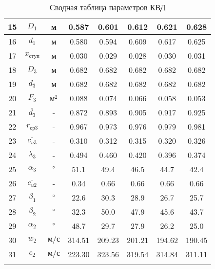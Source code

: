 \begin{center}
\begin{longtable}{|c|c|c|c|c|c|c|c|}
				15 & $D_1$ & м & 0.587 & 0.601 & 0.612 & 0.621 & 0.628 \\\hline
			
				16 & $d_1$ & м & 0.580 & 0.594 & 0.609 & 0.617 & 0.625 \\\hline
			
				17 & $x_{ступ}$ & м & 0.030 & 0.029 & 0.028 & 0.030 & 0.031 \\\hline
			
				18 & $D_3$ & м & 0.682 & 0.682 & 0.682 & 0.682 & 0.682 \\\hline
			
				19 & $d_3$ & м & 0.682 & 0.682 & 0.682 & 0.682 & 0.682 \\\hline
			
				20 & $F_3$ & $м^2$ & 0.088 & 0.074 & 0.066 & 0.058 & 0.053 \\\hline
			
				21 & $\overline{d_3}$ & - & 0.872 & 0.893 & 0.905 & 0.917 & 0.925 \\\hline
			
				22 & $\overline{r_{ср3}}$ & - & 0.967 & 0.973 & 0.976 & 0.979 & 0.981 \\\hline
			
				23 & $\overline{c_{u3}}$ & - & 0.310 & 0.312 & 0.315 & 0.320 & 0.326 \\\hline
			
				24 & $\lambda_3$ & - & 0.494 & 0.460 & 0.420 & 0.396 & 0.374 \\\hline
			
				25 & $\alpha_3$ & $\degree$ & 51.1 & 49.4 & 46.5 & 44.7 & 42.4 \\\hline
			
				26 & $\overline{c_{u2}}$ & - & 0.34 & 0.66 & 0.66 & 0.66 & 0.66 \\\hline
			
				27 & $\beta_1$ & $\degree$ & 22.6 & 30.3 & 28.9 & 26.7 & 25.7 \\\hline
			
				28 & $\beta_2$ & $\degree$ & 32.3 & 50.0 & 47.9 & 45.6 & 43.7 \\\hline
			
				29 & $\alpha_2$ & $\degree$ & 48.7 & 29.7 & 27.9 & 26.2 & 25.0 \\\hline
			
				30 & $w_2$ & $м/с$ & 314.51 & 209.23 & 201.21 & 194.62 & 190.45 \\\hline
			
				31 & $c_2$ & $м/с$ & 223.30 & 323.56 & 319.54 & 314.84 & 311.11 \\\hline
			
		\caption{Сводная таблица параметров КВД} \label{tab:hpc-stage-total}
		\end{longtable}
	\end{center}
